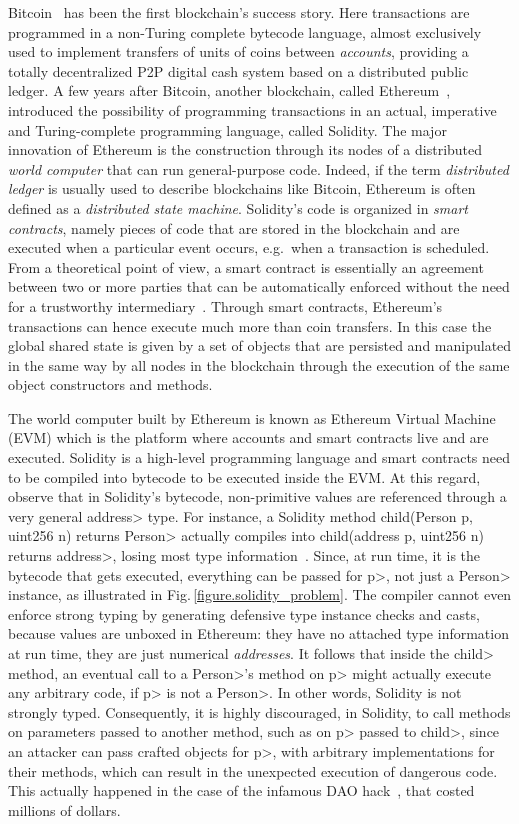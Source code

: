Bitcoin~\cite{Nakamoto08,book-mastering-bitcoin}  has been the first blockchain's success story. Here transactions are programmed in a non-Turing complete bytecode language, almost exclusively used to implement transfers of units of coins between \emph{accounts}, providing a totally decentralized P2P digital cash system based on a distributed public ledger. 
%
A few years after Bitcoin, another blockchain, called Ethereum~\cite{Buterin13,AntonopoulosW18}, introduced the possibility of programming transactions in an actual, imperative and Turing-complete programming language, called Solidity. The major innovation of Ethereum is the construction through its nodes of a distributed \emph{world computer} that can run general-purpose code. Indeed, if the term \emph{distributed ledger} is usually used to describe blockchains like Bitcoin, Ethereum is often defined as a \emph{distributed state machine}. Solidity's code is organized in \emph{smart contracts}, namely pieces of code that are stored in the blockchain and are executed when a particular event occurs, e.g.\ when a transaction is scheduled. From a theoretical point of view, a smart contract is essentially an agreement between two or more parties that can be automatically enforced without the need for a trustworthy intermediary~\cite{ebp}. Through smart contracts, Ethereum's transactions can hence execute much more than coin transfers. In this case the global shared state is given by a set of objects that are persisted and manipulated in the same way by all nodes in the blockchain through the execution of the same object constructors and methods.

The world computer built by Ethereum is known as Ethereum Virtual Machine (EVM) which is the platform where accounts and smart contracts live and are executed.
Solidity is a high-level programming language and smart contracts need to be compiled into bytecode to be executed inside the EVM. At this regard, observe that in Solidity's bytecode, non-primitive values are referenced through a very general \<address> type. For instance, a Solidity method \<child(Person p, uint256 n) returns Person> actually compiles into \<child(address p, uint256 n) returns address>, losing most type information~\cite{CrafaPZ19}. Since, at run time, it is the bytecode that gets executed, everything can be passed for \<p>, not just a \<Person> instance, as illustrated in Fig.\,\ref{figure.solidity_problem}.
The compiler cannot even enforce strong typing by generating defensive type instance checks and casts, because values are unboxed in Ethereum: they have no attached type information at run time, they are just numerical \emph{addresses}. It follows that inside the \<child> method, an eventual call to a \<Person>'s method on \<p> might actually execute any arbitrary code, if \<p> is not a \<Person>. In other words, Solidity is not strongly typed. Consequently, it is highly discouraged, in Solidity, to call methods on parameters passed to another method, such as on \<p> passed to \<child>, since an attacker can pass crafted objects for \<p>, with arbitrary implementations for their methods, which can result in the unexpected execution of dangerous code. This actually happened in the case of the infamous DAO hack~\cite{dao16}, that costed millions of dollars.

